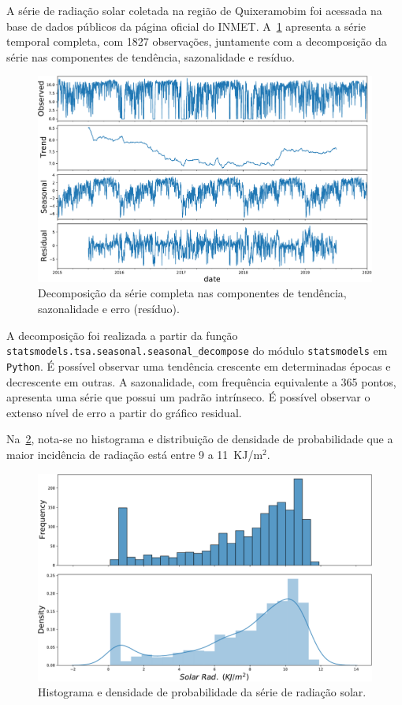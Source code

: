 \documentclass[a4paper]{ifacconf}
\begin{document}
A série de radiação solar coletada na região de Quixeramobim foi acessada na base de dados públicos da página oficial do \ac{INMET}. A~\ref{fig:decomposicao} apresenta a série temporal completa, com 1827 observações, juntamente com a decomposição da série nas componentes de tendência, sazonalidade e resíduo.
\begin{figure}
	\centering
	\includegraphics[width=0.9\columnwidth]{images/decomposicao.pdf}
	\caption{Decomposição da série completa nas componentes de tendência, sazonalidade e erro (resíduo).}\label{fig:decomposicao}
\end{figure}

A decomposição foi realizada a partir da função \texttt{statsmodels.tsa.seasonal.seasonal\_decompose} do módulo \texttt{statsmodels} em \texttt{Python}. É possível observar uma tendência crescente em determinadas épocas e decrescente em outras. A sazonalidade, com frequência equivalente a 365 pontos, apresenta uma série que possui um padrão intrínseco. É possível observar o extenso nível de erro a partir do gráfico residual.

Na~\ref{fig:hist_dist}, nota-se no histograma e distribuição de densidade de probabilidade que a maior incidência de radiação está entre 9 a 11~KJ/m$^{2}$.  
\begin{figure}
	\centering
	\includegraphics[width=0.9\columnwidth]{images/hist_dist.pdf}
	\caption{Histograma e densidade de probabilidade da série de radiação solar.}
	\label{fig:hist_dist}
\end{figure}
\end{document}
